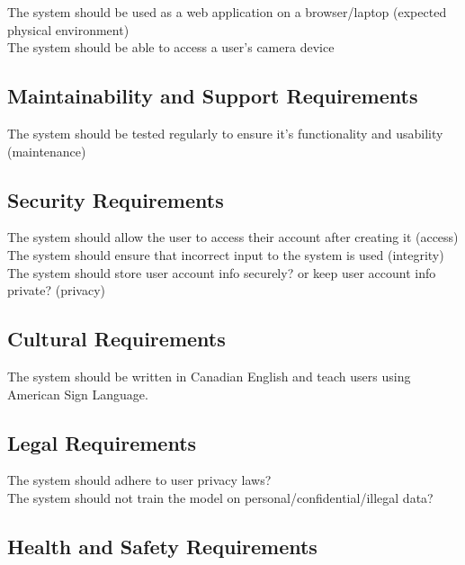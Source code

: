\documentclass[12pt, titlepage]{article}
\begin{document}
The system should be used as a web application on a browser/laptop (expected physical environment) \\

The system should be able to access a user's camera device \\

\subsection{Maintainability and Support Requirements}

The system should be tested regularly to ensure it's functionality and usability (maintenance) \\


\subsection{Security Requirements}

The system should allow the user to access their account after creating it (access) \\

The system should ensure that incorrect input to the system is used (integrity) \\

The system should store user account info securely? or keep user account info private? (privacy) \\

\subsection{Cultural Requirements}

The system should be written in Canadian English and teach users using American Sign Language. \\

\subsection{Legal Requirements}

The system should adhere to user privacy laws?  \\

The system should not train the model on personal/confidential/illegal data? \\


\subsection{Health and Safety Requirements}
\end{document}
